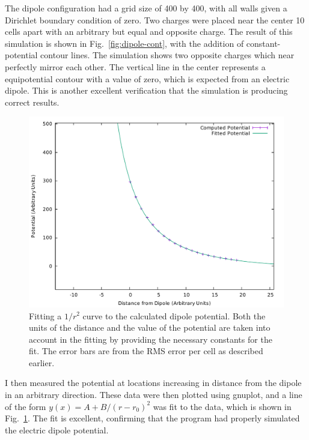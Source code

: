 The dipole configuration had a grid size of 400 by 400, with all walls given a Dirichlet boundary condition
of zero. Two charges were placed near the center 10 cells apart with an arbitrary but equal and opposite charge.
The result of this simulation is shown in Fig.~\ref{fig:dipole-cont}, with the addition of constant-potential
contour lines. The simulation shows two opposite charges which near perfectly mirror each other. The vertical
line in the center represents a equipotential contour with a value of zero, which is expected from an
electric dipole. This is another excellent verification that the simulation is producing correct results.

	\begin{figure}[h!]
		\centering
	\includegraphics[width=\linewidth]{dipole_fit.pdf}
		\caption[Fitting a $1/r^2$ curve to the calculated dipole potential.]{Fitting a $1/r^2$ curve to the calculated dipole potential. Both the units of the distance and the value of the potential are taken into account in the fitting by providing
		the necessary constants for the fit. The error bars are from the RMS error per cell as described earlier.} \label{fig:dipole-fit}
	\end{figure}



I then measured the potential at locations increasing in distance from the dipole in an arbitrary direction.
These data were then plotted using gnuplot, and a line of the form $y(x) = A + B / (r-r_0)^2$ was fit to the
data, which is shown in Fig.~\ref{fig:dipole-fit}. The fit is excellent, confirming that the program had properly simulated the electric dipole potential.

